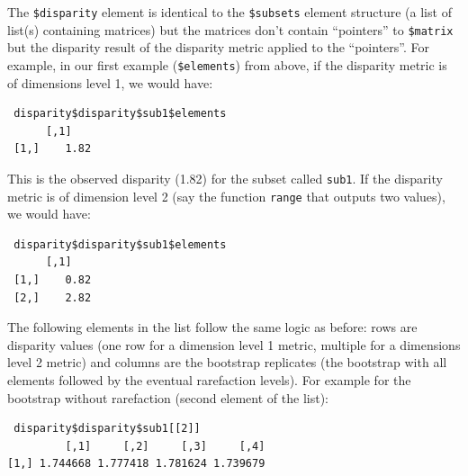\documentclass[
]{book}
\begin{document}
The \texttt{\$disparity} element is identical to the \texttt{\$subsets} element structure (a list of list(s) containing matrices) but the matrices don't contain ``pointers'' to \texttt{\$matrix} but the disparity result of the disparity metric applied to the ``pointers''.
For example, in our first example (\texttt{\$elements}) from above, if the disparity metric is of dimensions level 1, we would have:

\begin{verbatim}
 disparity$disparity$sub1$elements
      [,1]
 [1,]    1.82
\end{verbatim}

This is the observed disparity (1.82) for the subset called \texttt{sub1}.
If the disparity metric is of dimension level 2 (say the function \texttt{range} that outputs two values), we would have:

\begin{verbatim}
 disparity$disparity$sub1$elements
      [,1]
 [1,]    0.82
 [2,]    2.82
\end{verbatim}

The following elements in the list follow the same logic as before: rows are disparity values (one row for a dimension level 1 metric, multiple for a dimensions level 2 metric) and columns are the bootstrap replicates (the bootstrap with all elements followed by the eventual rarefaction levels).
For example for the bootstrap without rarefaction (second element of the list):

\begin{verbatim}
 disparity$disparity$sub1[[2]]
         [,1]     [,2]     [,3]     [,4]
[1,] 1.744668 1.777418 1.781624 1.739679 
\end{verbatim}

  
\end{document}
